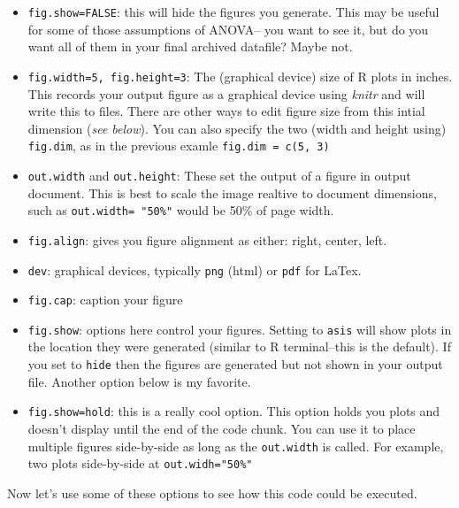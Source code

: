 \documentclass[
]{article}
\begin{document}
\begin{itemize}
\item
  \texttt{fig.show=FALSE}: this will hide the figures you generate. This
  may be useful for some of those assumptions of ANOVA-- you want to see
  it, but do you want all of them in your final archived datafile? Maybe
  not.
\item
  \texttt{fig.width=5,\ fig.height=3}: The (graphical device) size of R
  plots in inches. This records your output figure as a graphical device
  using \emph{knitr} and will write this to files. There are other ways
  to edit figure size from this intial dimension (\emph{see below}). You
  can also specify the two (width and height using) \texttt{fig.dim}, as
  in the previous examle \texttt{fig.dim\ =\ c(5,\ 3)}
\item
  \texttt{out.width} and \texttt{out.height}: These set the output of a
  figure in output document. This is best to scale the image realtive to
  document dimensions, such as \texttt{out.width=\ "50\%"} would be 50\%
  of page width.
\item
  \texttt{fig.align}: gives you figure alignment as either: right,
  center, left.
\item
  \texttt{dev}: graphical devices, typically \texttt{png} (html) or
  \texttt{pdf} for LaTex.
\item
  \texttt{fig.cap}: caption your figure
\item
  \texttt{fig.show}: options here control your figures. Setting to
  \texttt{\textquotesingle{}asis\textquotesingle{}} will show plots in
  the location they were generated (similar to R terminal--this is the
  default). If you set to
  \texttt{\textquotesingle{}hide\textquotesingle{}} then the figures are
  generated but not shown in your output file. Another option below is
  my favorite.
\item
  \texttt{fig.show=\textquotesingle{}hold\textquotesingle{}}: this is a
  really cool option. This option holds you plots and doesn't display
  until the end of the code chunk. You can use it to place multiple
  figures side-by-side as long as the \texttt{out.width} is called. For
  example, two plots side-by-side at \texttt{out.widh="50\%"}
\end{itemize}

Now let's use some of these options to see how this code could be
executed.
\end{document}
